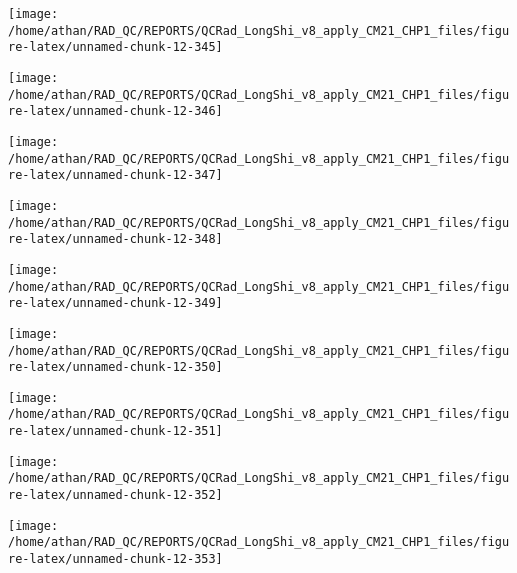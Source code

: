 \documentclass[
  10pt,
  a4paper,oneside]{article}
\begin{document}
\begin{center}\texttt{[image: /home/athan/RAD\_QC/REPORTS/QCRad\_LongShi\_v8\_apply\_CM21\_CHP1\_files/figure-latex/unnamed-chunk-12-345]} \end{center}

\begin{center}\texttt{[image: /home/athan/RAD\_QC/REPORTS/QCRad\_LongShi\_v8\_apply\_CM21\_CHP1\_files/figure-latex/unnamed-chunk-12-346]} \end{center}

\begin{center}\texttt{[image: /home/athan/RAD\_QC/REPORTS/QCRad\_LongShi\_v8\_apply\_CM21\_CHP1\_files/figure-latex/unnamed-chunk-12-347]} \end{center}

\begin{center}\texttt{[image: /home/athan/RAD\_QC/REPORTS/QCRad\_LongShi\_v8\_apply\_CM21\_CHP1\_files/figure-latex/unnamed-chunk-12-348]} \end{center}

\begin{center}\texttt{[image: /home/athan/RAD\_QC/REPORTS/QCRad\_LongShi\_v8\_apply\_CM21\_CHP1\_files/figure-latex/unnamed-chunk-12-349]} \end{center}

\begin{center}\texttt{[image: /home/athan/RAD\_QC/REPORTS/QCRad\_LongShi\_v8\_apply\_CM21\_CHP1\_files/figure-latex/unnamed-chunk-12-350]} \end{center}

\begin{center}\texttt{[image: /home/athan/RAD\_QC/REPORTS/QCRad\_LongShi\_v8\_apply\_CM21\_CHP1\_files/figure-latex/unnamed-chunk-12-351]} \end{center}

\begin{center}\texttt{[image: /home/athan/RAD\_QC/REPORTS/QCRad\_LongShi\_v8\_apply\_CM21\_CHP1\_files/figure-latex/unnamed-chunk-12-352]} \end{center}

\begin{center}\texttt{[image: /home/athan/RAD\_QC/REPORTS/QCRad\_LongShi\_v8\_apply\_CM21\_CHP1\_files/figure-latex/unnamed-chunk-12-353]} \end{center}
\end{document}

